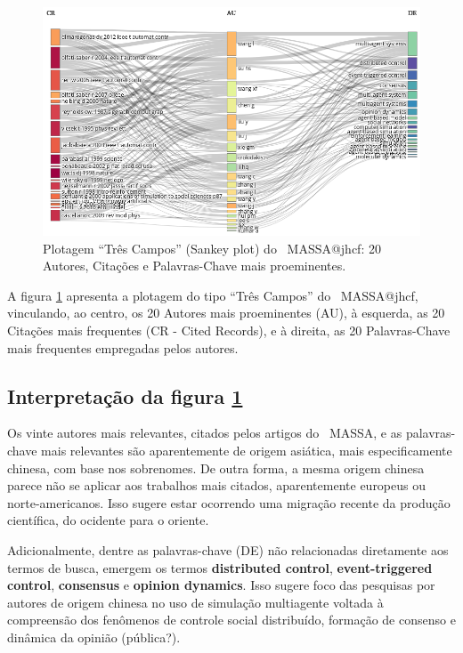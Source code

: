 \begin{figure}
    \centering
    \includegraphics[angle=0,width=1\textwidth]{exploratory-data-analysis/jhcf/PesqBibliogr/SimulacaoMultiagente/WoS-20210803/classico-mais-citacoes/Dataset/ThreeFieldPlot-AU-CR-DE-20-20-20.png}
    \caption{Plotagem ``Três Campos'' (Sankey plot) do \dataset\   MASSA@jhcf: 20 Autores, Citações e Palavras-Chave mais proeminentes.}
    \label{fig:MASSA@jhcf:ThreeFieldPlot}
\end{figure}

A figura \ref{fig:MASSA@jhcf:ThreeFieldPlot} apresenta a plotagem do tipo ``Três Campos'' do \dataset\   MASSA@jhcf, vinculando, ao centro, os 20 Autores mais proeminentes (AU), à esquerda, as 20 Citações mais frequentes (CR - Cited Records), e à direita, as 20 Palavras-Chave mais frequentes empregadas pelos autores.

\subsection{Interpretação da figura \ref{fig:MASSA@jhcf:ThreeFieldPlot}}

Os vinte autores mais relevantes, citados pelos artigos do \dataset\ MASSA, e as palavras-chave mais relevantes são aparentemente de origem asiática, mais especificamente chinesa, com base nos sobrenomes. De outra forma, a mesma origem chinesa parece não se aplicar aos trabalhos mais citados, aparentemente europeus ou norte-americanos. Isso sugere estar ocorrendo uma migração recente da produção científica, do ocidente para o oriente. 

Adicionalmente, dentre as palavras-chave (DE) não relacionadas diretamente aos termos de busca, emergem os termos \textbf{distributed control}, \textbf{event-triggered control}, \textbf{consensus} e \textbf{opinion dynamics}. Isso sugere foco das pesquisas por autores de origem chinesa no uso de simulação multiagente voltada à compreensão dos fenômenos de controle social distribuído, formação de consenso e dinâmica da opinião (pública?).

